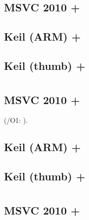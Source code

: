 \subsection{MSVC 2010 + \Ox}



\subsection{Keil (ARM) + \Othree}



\subsection{Keil (thumb) + \Othree}



\section{}

\subsection{MSVC 2010 + }

(/O1: ).



\subsection{Keil (ARM) + \Othree}



\subsection{Keil (thumb) + \Othree}



\section{}

\subsection{MSVC 2010 + }

